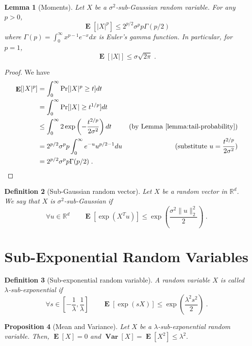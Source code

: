 \documentclass[12pt]{article}
\newtheorem{definition}{Definition}
\newtheorem{proposition}[definition]{Proposition}
\newtheorem{lemma}[definition]{Lemma}
\newcommand{\R}{\mathbb{R}}
\newcommand{\norm}[1]{\|{#1}\|}
\DeclareMathOperator*{\Var}{\mathbf{Var}}
\DeclareMathOperator*{\Exp}{\mathbf{E}}
\begin{document}
\begin{lemma}[Moments]
\label{lemma:sub-gaussian-moments}
Let $X$ be a $\sigma^2$-sub-Gaussian random variable. For any $p > 0$,
$$
\Exp\left[ \left|X\right|^p \right] \le 2^{p/2} \sigma^p p \Gamma(p/2)
$$
where $\Gamma(p) = \int_0^\infty x^{p-1} e^{-x} dx$ is Euler's gamma function.
In particular, for $p=1$,
$$
\Exp[|X|] \le \sigma \sqrt{2 \pi} \; .
$$
\end{lemma}

\begin{proof}
We have
\begin{align*}
\Exp[|X|^p]
& = \int_0^\infty \Pr[|X|^p \ge t] dt \\
& = \int_0^\infty \Pr[|X| \ge t^{1/p}] dt \\
& \le \int_0^\infty 2\exp\left( - \frac{t^{2/p}}{2 \sigma^2} \right) dt & \text{(by Lemma~\ref{lemma:tail-probability})} \\
& = 2^{p/2} \sigma^p p \int_0^\infty e^{-u} u^{p/2-1} du & \text{(substitute $u=\frac{t^{2/p}}{2\sigma^2}$)} \\
& = 2^{p/2} \sigma^p p \Gamma(p/2) \; .
\end{align*}
\end{proof}

\begin{definition}[Sub-Gaussian random vector]
Let $X$ be a random vector in $\R^d$. We say that $X$ is \emph{$\sigma^2$-sub-Gaussian}
if
$$
\forall u \in \R^d \qquad \Exp\left[ \exp \left( X^T u \right) \right] \le \exp\left( \frac{\sigma^2 \norm{u}_2^2}{2} \right) \; .
$$
\end{definition}

\section{Sub-Exponential Random Variables}

\begin{definition}[Sub-exponential random variable]
A random variable $X$ is called $\lambda$-sub-exponential if
$$
\forall s \in \left[ - \frac{1}{\lambda}, \frac{1}{\lambda} \right] \qquad \Exp\left[ \exp \left( s X \right) \right] \le \exp\left( \frac{\lambda^2 s^2}{2} \right) \; .
$$
\end{definition}

\begin{proposition}[Mean and Variance]
Let $X$ be a $\lambda$-sub-exponential random variable.
Then, $\Exp[X] = 0$ and $\Var[X] = \Exp[X^2] \le \lambda^2$.
\end{proposition}
\end{document}
